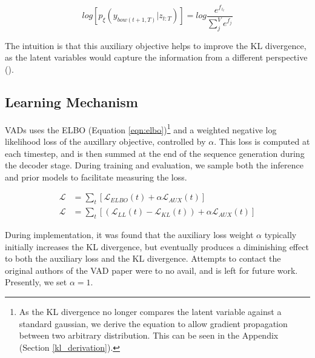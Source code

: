 \documentclass[12pt,twoside]{report}
\begin{document}
\begin{equation}
	log [p_\xi(y_{bow(t+1,T)}|z_{t:T}) ] = log  \frac{e^{f_{z_{t}}}}{\sum^V_j e^{f_{j}}}
\end{equation}

The intuition is that this auxiliary objective helps to improve the KL divergence, as the latent variables would capture the information from a different perspective (\cite{du_variational_2018}).

\subsection{Learning Mechanism}


VADs uses the ELBO (Equation \ref{eqn:elbo})\footnote{As the KL divergence no longer compares the latent variable against a standard gaussian, we derive the equation to allow gradient propagation between two arbitrary distribution. This can be seen in the Appendix (Section \ref{kl_derivation}).} and a weighted negative log likelihood loss of the auxillary objective, controlled by $\alpha$. This loss is computed at each timestep, and is then summed at the end of the sequence generation during the decoder stage. During training and evaluation, we sample both the inference and prior models to facilitate measuring the loss.

\begin{equation}
	\begin{split}
		\mathcal{L} &= \sum_t [\mathcal{L}_{ELBO}(t) + \alpha \mathcal{L}_{AUX}(t)] \\
		\mathcal{L} &= \sum_t [(\mathcal{L}_{LL}(t) - \mathcal{L}_{KL}(t)) + \alpha \mathcal{L}_{AUX}(t)] 
	\end{split}
\end{equation}

During implementation, it was found that the auxiliary loss weight $\alpha$ typically initially increases the KL divergence, but eventually produces a diminishing effect to both the auxiliary loss and the KL divergence. Attempts to contact the original authors of the VAD paper were to no avail, and is left for future work. Presently, we set $\alpha=1$. 
 
\end{document}
